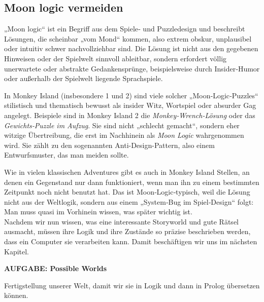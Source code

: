 \documentclass[parskip=half,a4paper,11pt]{scrreprt}
\begin{document}
\subsection{Moon logic vermeiden}

„Moon logic“ ist ein Begriff aus dem Spiele‑ und Puzzledesign und beschreibt Lösungen, die scheinbar „vom Mond“ kommen, also extrem obskur, unplausibel oder intuitiv schwer nachvollziehbar sind. Die Lösung ist nicht aus den gegebenen Hinweisen oder der Spielwelt sinnvoll ableitbar, sondern erfordert völlig unerwartete oder abstrakte Gedankensprünge, beispielsweise durch Insider‑Humor oder außerhalb der Spielwelt liegende Sprachspiele.

In Monkey Island (insbesondere 1 und 2) sind viele solcher „Moon‑Logic‑Puzzles“ stilistisch und thematisch bewusst als insider Witz, Wortspiel oder absurder Gag angelegt. Beispiele sind in Monkey Island 2 die \textit{Monkey‑Wrench‑Lösung} oder das \textit{Gewichts‑Puzzle im Aufzug}. Sie sind nicht „schlecht gemacht“, sondern eher witzige Übertreibung, die erst im Nachhinein als \textit{Moon Logic} wahrgenommen wird. Sie zählt zu den sogenannten Anti-Design-Pattern, also einem Entwurfsmuster, das man meiden sollte.

Wie in vielen klassischen Adventures gibt es auch in Monkey Island Stellen, an denen ein Gegenstand nur dann funktioniert, wenn man ihn zu einem bestimmten Zeitpunkt noch nicht benutzt hat. Das ist Moon‑Logic‑typisch, weil die Lösung nicht aus der Weltlogik, sondern aus einem „System‑Bug im Spiel‑Design“ folgt: Man muss quasi im Vorhinein wissen, was später wichtig ist.\\

Nachdem wir nun wissen, was eine interessante Storyworld und gute Rätsel ausmacht, müssen ihre Logik und ihre Zustände so präzise beschrieben werden, dass ein Computer sie verarbeiten kann. Damit beschäftigen wir uns im nächsten Kapitel.

\textbf{AUFGABE: Possible Worlds}

Fertigstellung unserer Welt, damit wir sie in Logik und dann in Prolog übersetzen können.
\end{document}
